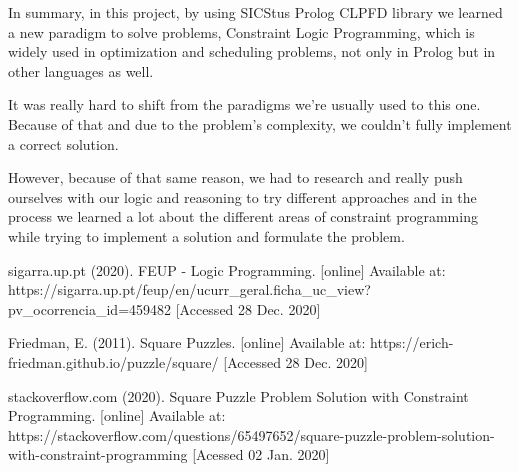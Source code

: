 \documentclass[runningheads]{llncs}
\begin{document}
In summary, in this project, by using SICStus Prolog CLPFD library we learned a new paradigm to solve problems, Constraint Logic Programming, which is widely used in optimization and scheduling problems, not only in Prolog but in other languages as well.

It was really hard to shift from the paradigms we're usually used to this one.
Because of that and due to the problem's complexity, we couldn't fully implement a correct solution. 

However, because of that same reason, we had to research and really push ourselves with our logic and reasoning to try different approaches and in the process we learned a lot about the different areas of constraint programming while trying to implement a solution and formulate the problem.

\begin{thebibliography}{8}

\bibitem{}
sigarra.up.pt (2020). FEUP - Logic Programming. [online] Available at: https://sigarra.up.pt/feup/en/ucurr\_geral.ficha\_uc\_view?pv\_ocorrencia\_id=459482 [Accessed 28 Dec. 2020]

Friedman, E. (2011). Square Puzzles. [online] Available at: https://erich-friedman.github.io/puzzle/square/ [Accessed 28 Dec. 2020]

\bibitem{}
stackoverflow.com (2020). Square Puzzle Problem Solution with Constraint Programming. [online] Available at: https://stackoverflow.com/questions/65497652/square-puzzle-problem-solution-with-constraint-programming [Acessed 02 Jan. 2020]

\end{thebibliography}
\end{document}
